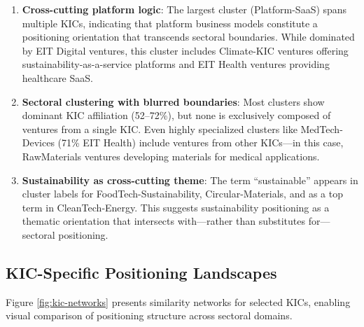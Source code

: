 \documentclass[../main.tex]{subfiles}
\begin{document}
\begin{enumerate}
    \item \textbf{Cross-cutting platform logic}: The largest cluster (Platform-SaaS) spans multiple KICs, indicating that platform business models constitute a positioning orientation that transcends sectoral boundaries. While dominated by EIT Digital ventures, this cluster includes Climate-KIC ventures offering sustainability-as-a-service platforms and EIT Health ventures providing healthcare SaaS.

    \item \textbf{Sectoral clustering with blurred boundaries}: Most clusters show dominant KIC affiliation (52--72\%), but none is exclusively composed of ventures from a single KIC. Even highly specialized clusters like MedTech-Devices (71\% EIT Health) include ventures from other KICs---in this case, RawMaterials ventures developing materials for medical applications.

    \item \textbf{Sustainability as cross-cutting theme}: The term ``sustainable'' appears in cluster labels for FoodTech-Sustainability, Circular-Materials, and as a top term in CleanTech-Energy. This suggests sustainability positioning as a thematic orientation that intersects with---rather than substitutes for---sectoral positioning.
\end{enumerate}

\subsection{KIC-Specific Positioning Landscapes}

Figure \ref{fig:kic-networks} presents similarity networks for selected KICs, enabling visual comparison of positioning structure across sectoral domains.
\end{document}
